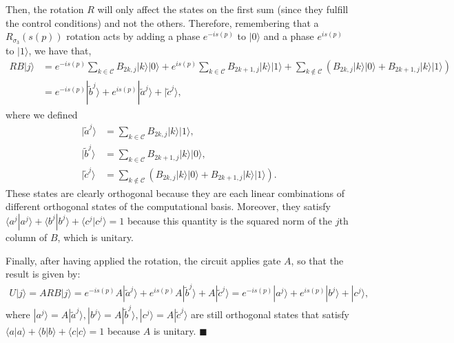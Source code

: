 \documentclass[10pt,letterpaper]{article} %
\begin{document}
Then, the rotation $R$ will only affect the states on the first sum (since they fulfill the control conditions)
and not the others. Therefore,  
remembering that a $R_{\sigma_3}(s(p))$ rotation acts by adding a phase $e^{-is(p)}$ to $|0\rangle$
and a phase $e^{is(p)}$ to $|1\rangle$, we have that,
\begin{align}
RB|j\rangle& = e^{-is(p)} \sum_{k \in \mathcal{C}} B_{2k,j} |k\rangle |0\rangle + e^{is(p)} \sum_{k \in \mathcal{C}} B_{2k+1,j} |k\rangle |1\rangle 
+ \sum_{k \not\in \mathcal{C}} \left( B_{2k,j} |k\rangle|0\rangle  + B_{2k+1,j} |k \rangle |1\rangle  \right) \nonumber \\
& = e^{-is(p)} |\tilde{b}^{j}\rangle + e^{is(p)} |\tilde{a}^j\rangle + |\tilde{c}^j\rangle,
\end{align}
where we defined
\begin{align*}
|\tilde{a}^j \rangle &= \sum_{k \in \mathcal{C}} B_{2k,j}|k\rangle|1\rangle,\\
|\tilde{b}^j\rangle &= \sum_{k \in \mathcal{C}} B_{2k+1,j} |k\rangle |0 \rangle,\\
|\tilde{c}^j\rangle &= \sum_{k \not\in \mathcal{C}}\left( B_{2k,j} |k\rangle|0\rangle+ B_{2k+1,j} |k \rangle |1\rangle  \right).
\end{align*}
These states are clearly orthogonal because they are each linear combinations of different 
orthogonal states of the computational basis. 
Moreover, they satisfy  $\langle a^j| a^j\rangle + \langle b^j| b^j\rangle + \langle c^j| c^j\rangle = 1$ because this quantity is the squared norm of the $j$th column of $B$, 
which is unitary. 

Finally, after having applied the rotation, the circuit applies gate $A$, 
so that the result is given by:
\begin{eqnarray}
U|j\rangle = ARB|j\rangle = e^{-is(p)} A |\tilde{a}^j\rangle + e^{is(p)} A |\tilde{b}^j\rangle + A |\tilde{c}^j\rangle = e^{-is(p)} |a^j\rangle + e^{is(p)} |b^j\rangle + |c^j\rangle,
\end{eqnarray}
where $|a^j\rangle = A |\tilde{a}^j\rangle, |b^j\rangle = A |\tilde{b}^j\rangle, |c^j\rangle = A |\tilde{c}^j\rangle$ are still orthogonal
states that satisfy $\langle a| a\rangle + \langle b| b\rangle + \langle c| c\rangle = 1$ because $A$ is unitary. $\blacksquare$  \\
 $\;$ \\
\end{document}
